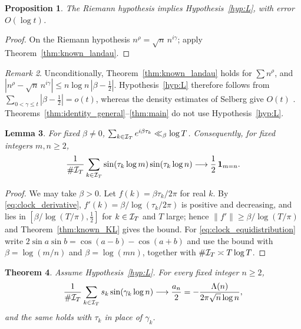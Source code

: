\documentclass[11pt,reqno]{amsart}
\theoremstyle{plain}\newtheorem{theorem}{Theorem}[section]\newtheorem{proposition}[theorem]{Proposition}\newtheorem{lemma}[theorem]{Lemma}\newtheorem{corollary}[theorem]{Corollary}
\theoremstyle{definition}\newtheorem{hypothesis}[theorem]{Hypothesis}\newtheorem{definition}[theorem]{Definition}
\theoremstyle{remark}\newtheorem{remark}[theorem]{Remark}\newtheorem{experiment}[theorem]{Experiment}\newtheorem{question}[theorem]{Question}\newtheorem{heuristic}[theorem]{Heuristic}\newtheorem{conjecture}[theorem]{Conjecture}
\begin{document}
\begin{proposition}\label{prop:RH_implies_L}
The Riemann hypothesis implies Hypothesis~\ref{hyp:L}, with error $O(\log t)$.
\end{proposition}

\begin{proof}
On the Riemann hypothesis $n^\rho=\sqrt n\,n^{i\gamma}$; apply Theorem~\ref{thm:known_landau}.
\end{proof}

\begin{remark}\label{rem:L_unconditional}
Unconditionally, Theorem~\ref{thm:known_landau} holds for $\sum n^\rho$, and $|n^{\rho}-\sqrt n\,n^{i\gamma}|\le n\log n\,|\beta-\frac12|$. Hypothesis~\ref{hyp:L} therefore follows from $\sum_{0<\gamma\le t}|\beta-\frac12|=o(t)$, whereas the density estimates of Selberg give $O(t)$ \cite[\S9.24]{Titchmarsh1986}. Theorems~\ref{thm:identity_general}--\ref{thm:main} do not use Hypothesis~\ref{hyp:L}.
\end{remark}

\begin{lemma}\label{lem:clock_equidistribution}
For fixed $\beta\ne0$, $\sum_{k\in\mathcal I_T}e^{i\beta\tau_k}\ll_\beta\log T$. Consequently, for fixed integers $m,n\ge2$,
\begin{equation}
\frac1{\#\mathcal I_T}\sum_{k\in\mathcal I_T}\sin(\tau_k\log m)\sin(\tau_k\log n)\longrightarrow\frac12\,\mathbf 1_{m=n}.
\label{eq:clock_equidistribution}
\end{equation}
\end{lemma}

\begin{proof}
We may take $\beta>0$. Let $f(k)=\beta\tau_k/2\pi$ for real $k$. By \eqref{eq:clock_derivative}, $f'(k)=\beta/\log(\tau_k/2\pi)$ is positive and decreasing, and lies in $[\beta/\log(T/\pi),\frac12]$ for $k\in\mathcal I_T$ and $T$ large; hence $\|f'\|\ge\beta/\log(T/\pi)$ and Theorem~\ref{thm:known_KL} gives the bound. For \eqref{eq:clock_equidistribution} write $2\sin a\sin b=\cos(a-b)-\cos(a+b)$ and use the bound with $\beta=\log(m/n)$ and $\beta=\log(mn)$, together with $\#\mathcal I_T\asymp T\log T$.
\end{proof}

\begin{theorem}\label{thm:projection}
Assume Hypothesis~\ref{hyp:L}. For every fixed integer $n\ge2$,
\begin{equation}
\frac1{\#\mathcal I_T}\sum_{k\in\mathcal I_T}s_k\sin(\gamma_k\log n)\longrightarrow\frac{a_n}2=-\frac{\Lambda(n)}{2\pi\sqrt n\log n},
\label{eq:projection}
\end{equation}
and the same holds with $\tau_k$ in place of $\gamma_k$.
\end{theorem}
\end{document}
